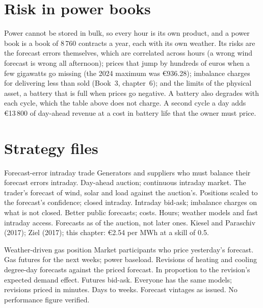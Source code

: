 \section{Risk in power books}

Power cannot be stored in bulk, so every hour is its own product, and a power book is a book of 8\,760 contracts a year, each with its own weather.
Its risks are the forecast errors themselves, which are correlated across hours (a wrong wind forecast is wrong all afternoon); prices that jump
by hundreds of euros when a few gigawatts go missing (the 2024 maximum was \euro936.28); imbalance charges for delivering less than sold (Book~3,
chapter~6); and the limits of the physical asset, a battery that is full when prices go negative. A battery also degrades with each cycle, which the
table above does not charge. A second cycle a day adds \euro13\,800 of day-ahead revenue at a cost in battery life that the owner must price.

\section{Strategy files}

\begin{strategyfile}{Forecast-error intraday trade}\label{strat:s2:power-and-gas-trading:forecast}
 Generators and suppliers who must balance their forecast errors intraday.
 Day-ahead auction; continuous intraday market.
 The trader's forecast of wind, solar and load against the auction's.
 Positions scaled to the forecast's confidence; closed intraday.
 Intraday bid-ask; imbalance charges on what is not closed.
 Better public forecasts; costs.
 Hours; weather models and fast intraday access.
 Forecasts as of the auction, not later ones.
 Kiesel and Paraschiv (2017); Ziel (2017); this chapter: \euro2.54 per MWh at a skill of 0.5.
\end{strategyfile}

\begin{strategyfile}{Weather-driven gas position}\label{strat:s2:power-and-gas-trading:weather}
 Market participants who price yesterday's forecast.
 Gas futures for the next weeks; power baseload.
 Revisions of heating and cooling degree-day forecasts against the priced forecast.
 In proportion to the revision's expected demand effect.
 Futures bid-ask.
 Everyone has the same models; revisions priced in minutes.
 Days to weeks.
 Forecast vintages as issued.
 No performance figure verified.
\end{strategyfile}

